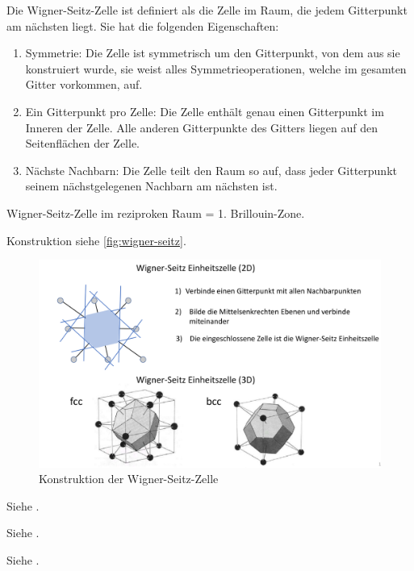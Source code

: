 \label{q:33}

Die Wigner-Seitz-Zelle ist definiert als die Zelle im Raum, die jedem Gitterpunkt am nächsten 
liegt. Sie hat die folgenden Eigenschaften:
\begin{enumerate}
    \item Symmetrie: Die Zelle ist symmetrisch um den Gitterpunkt, von dem aus sie konstruiert wurde, sie weist alles Symmetrieoperationen, welche im gesamten Gitter vorkommen, auf. 
    \item Ein Gitterpunkt pro Zelle: Die Zelle enthält genau einen Gitterpunkt im Inneren der Zelle. Alle anderen Gitterpunkte des Gitters liegen auf den Seitenflächen der Zelle.
    \item Nächste Nachbarn: Die Zelle teilt den Raum so auf, dass jeder Gitterpunkt seinem nächstgelegenen Nachbarn am nächsten ist. %
\end{enumerate}
Wigner-Seitz-Zelle im reziproken Raum = 1. Brillouin-Zone.

Konstruktion siehe \autoref{fig:wigner-seitz}.
\begin{figure}[H]
    \centering
    \includegraphics[width=0.8\linewidth]{resources/15-06-2015/q33.png}
    \caption{Konstruktion der Wigner-Seitz-Zelle}
    \label{fig:wigner-seitz}
\end{figure}

\label{q:34}

Siehe .

\label{q:35}

Siehe .

\label{q:36}

Siehe .


